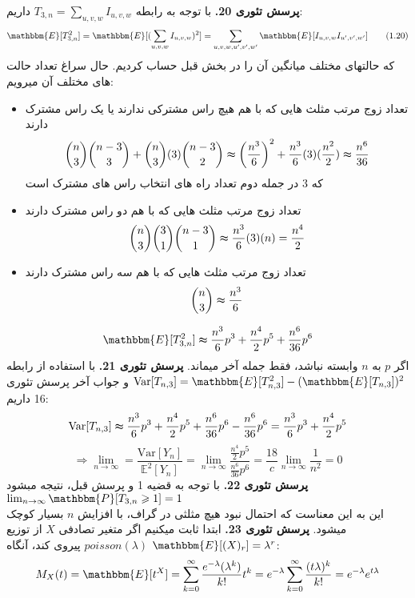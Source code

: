 \documentclass[11pt]{article}
\begin{document}
\begin{persian}
\textbf{پرسش تئوری 20.}
با توجه به رابطه 
$T_{3,n} = \sum_{u,v,w} I_{u,v,w}$
داریم:
\begin{equation*}
\mathbbm{E}[T_{3,n}^2] = \mathbbm{E}[(\sum_{u,v,w} I_{u,v,w})^2] = \sum_{u,v,w,u',v',w'} \mathbbm{E}[I_{u,v,w}I_{u',v',w'}] \tag{1.20}
\end{equation*}
که حالتهای مختلف میانگین آن را در بخش قبل حساب کردیم. حال سراغ تعداد حالت های مختلف  آن میرویم:
\begin{itemize}
\item تعداد زوج مرتب مثلث هایی که با هم هیچ راس مشترکی ندارند یا یک راس مشترک دارند
$${n \choose 3}{n-3 \choose 3} + {n \choose 3}(3){n-3 \choose 2} \thickapprox \left( \frac{n^3}{6} \right)^2 + \frac{n^3}{6}(3)( \frac{n^2}{2}) \thickapprox  \frac{n^6}{36}$$
که 3 در جمله دوم تعداد راه های انتخاب راس های مشترک است
\item تعداد زوج مرتب مثلث هایی که با هم دو راس مشترک دارند
$${n \choose 3}{3 \choose 1}{n-3 \choose 1}  \thickapprox \frac{n^3}{6}(3)(n) = \frac{n^4}{2}$$ 
\item تعداد زوج مرتب مثلث هایی که با هم سه راس مشترک دارند
$${n \choose 3} \thickapprox \frac{n^3}{6}$$
\end{itemize}
\begin{align*}
\mathbbm{E}[T_{3,n}^2] &\thickapprox  \frac{n^3}{6}  p^3 + \frac{n^4}{2} p^5  + \frac{n^6}{36} p^6 \\
\end{align*}
اگر $p$ به $n$ وابسته نباشد، فقط جمله آخر میماند.
\newline
\textbf{پرسش تئوری 21.}
با استفاده از رابطه 
$\mathrm{Var} [T_{n,3}] =\mathbbm{E}[T_{n,3}^2] - (\mathbbm{E}[T_{n,3}])^2$
و جواب آخر پرسش تئوری 16 داریم:
$$
\mathrm{Var} [T_{n,3}] \thickapprox \frac{n^3}{6}  p^3 + \frac{n^4}{2} p^5  + \frac{n^6}{36} p^6  - \frac{n^6}{36}p^6 =  \frac{n^3}{6}  p^3 + \frac{n^4}{2} p^5
$$
$$
\Rightarrow \lim_{n \to \infty} =\frac{\mathrm{Var}[Y_n]}{\mathbb{E}^2[Y_n]} = \lim_{n \to \infty}  \frac{\frac{n^4}{2}p^5}{\frac{n^6}{36}p^6} =  \frac{18}{c}  \lim_{n \to \infty} \frac{1}{n^2} = 0
$$
\textbf{پرسش تئوری 22.}
با توجه به قضیه 1 و پرسش قبل، نتیجه مبشود 
$ \lim_{n \to \infty} \mathbbm{P}[T_{3,n} \geqslant 1] = 1$
\\
این به این معناست که احتمال نبود هیچ مثلثی در گراف، با افزایش $n$ بسیار کوچک میشود.
\newline
\textbf{پرسش تئوری 23.}
ابتدا ثابت میکنیم اگر متغیر تصادفی $X$ از توزیع 
$poisson(\lambda)$ 
پیروی کند، آنگاه 
$\mathbbm{E}[(X)_r] = \lambda^r$:
$$
M_X(t) = \mathbbm{E}[t^X] = \sum_{k=0}^{\infty} \frac{e^{-\lambda}(\lambda^k)}{k!} t^k = e^{-\lambda} \sum_{k=0}^{\infty} \frac{(t\lambda)^k}{k!} = e^{-\lambda} e^{t\lambda}
$$
\end{persian}
\end{document}
